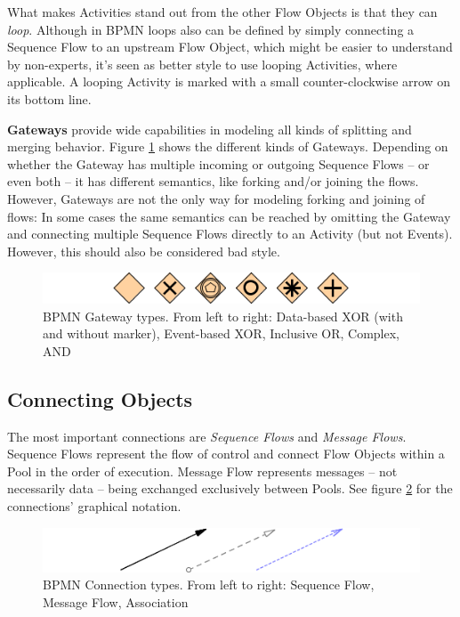 What makes Activities stand out from the other Flow Objects is that they can
\emph{loop}.  Although in BPMN loops also can be defined by simply connecting a
Sequence Flow to an upstream Flow Object, which might be easier to understand by
non-experts, it's seen as better style to use looping Activities, where
applicable.  A looping Activity is marked with a small counter-clockwise arrow on
its bottom line.

\textbf{Gateways} provide wide capabilities in modeling all kinds of splitting
and merging behavior.  Figure \ref{fig:gateways} shows the different kinds of
Gateways.  Depending on whether the Gateway has multiple incoming or outgoing
Sequence Flows -- or even both -- it has different semantics, like forking
and/or joining the flows.  However, Gateways are not the only way for modeling
forking and joining of flows: In some cases the same semantics can be reached
by omitting the Gateway and connecting multiple Sequence Flows directly to an
Activity (but not Events).  However, this should also be considered bad style.

\begin{figure}[ht]
	\centering
	\includegraphics[width=.75\textwidth]{figures/bpmn/gateways.png}
	\caption[BPMN Gateway types]{BPMN Gateway types.  From left to right: Data-based
	XOR (with and without marker), Event-based XOR, Inclusive OR, Complex, AND}
	\label{fig:gateways}
\end{figure}


\subsection{Connecting Objects}

The most important connections are \emph{Sequence Flows} and \emph{Message Flows}.
Sequence Flows represent the flow of control and connect Flow Objects within a
Pool in the order of execution.  Message Flow represents messages -- not
necessarily data -- being exchanged exclusively between Pools.  See figure
\ref{fig:connections} for the connections' graphical notation.

\begin{figure}[ht]
	\centering
	\includegraphics[width=.75\textwidth]{figures/bpmn/connections.png}
	\caption[BPMN Connection types]{BPMN Connection types.  From left to right:
	Sequence Flow, Message Flow, Association}
	\label{fig:connections}
\end{figure}

